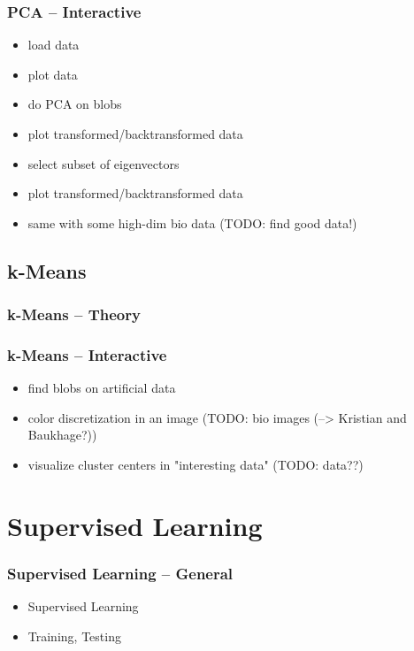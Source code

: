 \documentclass[english,final,compress]{beamer}
\begin{document}
\begin{frame}
    \frametitle{PCA -- Interactive}
    \begin{itemize}
        \item  load data
        \item  plot data
        \item  do PCA on blobs
        \item  plot transformed/backtransformed data
        \item  select subset of eigenvectors
        \item  plot transformed/backtransformed data
        \item  same with some high-dim bio data (TODO: find good data!)
    \end{itemize}
\end{frame}

\subsection{k-Means}

\begin{frame}
    \frametitle{k-Means -- Theory}
\end{frame}

\begin{frame}
    \frametitle{k-Means -- Interactive}
    \begin{itemize}
        \item  find blobs on artificial data
        \item  color discretization in an image (TODO: bio images (--> Kristian and Baukhage?))
        \item  visualize cluster centers in "interesting data" (TODO: data??)
    \end{itemize}
\end{frame}

\section{Supervised Learning}


\begin{frame}
    \frametitle{Supervised Learning -- General}
    \begin{itemize}
        \item Supervised Learning
        \item Training, Testing
    \end{itemize}
\end{frame}
\end{document}
